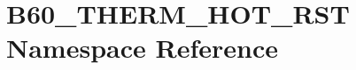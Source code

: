 \hypertarget{namespace_b60___t_h_e_r_m___h_o_t___r_s_t}{}\section{B60\+\_\+\+T\+H\+E\+R\+M\+\_\+\+H\+O\+T\+\_\+\+R\+ST Namespace Reference}
\label{namespace_b60___t_h_e_r_m___h_o_t___r_s_t}
